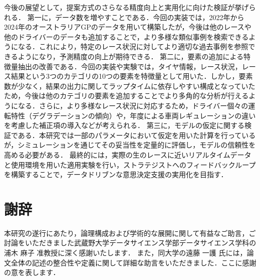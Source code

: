 \documentclass{deimj}
\begin{document}
今後の展望として，提案方式のさらなる精度向上と実用化に向けた検証が挙げられる．
第一に，データ数を増やすことである．今回の実装では，2022年から2024年のオーストラリアGPのデータを用いて構築したが，今後は他のレースや他のドライバーのデータも追加することで，より多様な類似事例を検索できるようになる．これにより，特定のレース状況に対してより適切な過去事例を参照できるようになり，予測精度の向上が期待できる．
第二に，要素の追加による特徴量抽出の改善である．今回の実装や実験では，タイヤ情報，レース状況，レース結果という3つのカテゴリの10つの要素を特徴量として用いた．しかし，要素数が少なく，結果の出力に関してラップタイムに依存しやすい構成となっていたため，今後は他のカテゴリの要素を追加することでより多角的な分析が行えるようになる．さらに，より多様なレース状況に対応するため，ドライバー個々の運転特性（デグラデーションの傾向）や，年度による車両レギュレーションの違いを考慮した補正項の導入などが考えられる．
第三に，モデルの仮定に関する検証である．本研究では一部のパラメータにおいて仮定を用いた計算を行っているが，シミュレーションを通じてその妥当性を定量的に評価し，モデルの信頼性を高める必要がある．
最終的には，実際の生のレースに近いリアルタイムデータと使用環境を用いた適用実験を行い，ストラテジストへのフィードバックループを構築することで，データドリブンな意思決定支援の実用化を目指す．

\vspace{2em}
\section*{謝辞}

本研究の遂行にあたり，論理構成および学術的な展開に関して有益なご助言，ご討論をいただきました武蔵野大学データサイエンス学部データサイエンス学科の浦木 麻子 准教授に深く感謝いたします．
また，同大学の遠藤 一護 氏には，論文全体の記述の整合性や定義に関して詳細な助言をいただきました．ここに感謝の意を表します．

\vspace{2em}




\end{document}
